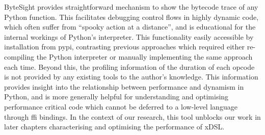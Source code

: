 ByteSight provides straightforward mechanism to show the bytecode trace of any Python function.
This facilitates debugging control flows in highly dynamic code, which often suffer from ``spooky action at a distance'', and is educational for the internal workings of Python's interpreter.
This functionality easily accessible by installation from \ac{pypi}, contrasting previous approaches which required either re-compiling the Python interpreter or manually implementing the same approach each time.
Beyond this, the profiling information of the duration of each opcode is not provided by any existing tools to the author's knowledge. This information provides insight into the relationship between performance and dynamism in Python, and is more generally helpful for understanding and optimising performance critical code which cannot be deferred to a low-level language through \ac{ffi} bindings.
In the context of our research, this tool unblocks our work in later chapters characterising and optimising the performance of xDSL.
